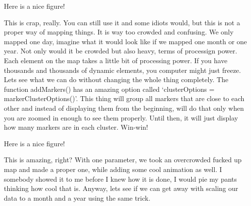 \documentclass[]{book}
\newenvironment{Shaded}{\begin{snugshade}}{\end{snugshade}}
\newcommand{\CommentTok}[1]{\textcolor[rgb]{0.56,0.35,0.01}{\textit{#1}}}
\newcommand{\DataTypeTok}[1]{\textcolor[rgb]{0.13,0.29,0.53}{#1}}
\newcommand{\DecValTok}[1]{\textcolor[rgb]{0.00,0.00,0.81}{#1}}
\newcommand{\FloatTok}[1]{\textcolor[rgb]{0.00,0.00,0.81}{#1}}
\newcommand{\KeywordTok}[1]{\textcolor[rgb]{0.13,0.29,0.53}{\textbf{#1}}}
\newcommand{\NormalTok}[1]{#1}
\newcommand{\OperatorTok}[1]{\textcolor[rgb]{0.81,0.36,0.00}{\textbf{#1}}}
\newcommand{\StringTok}[1]{\textcolor[rgb]{0.31,0.60,0.02}{#1}}
\begin{document}
\hypertarget{htmlwidget-92dc0142126f5aedeb65}{}

\label{fig:nice-fig80}Here is a nice figure!

This is crap, really. You can still use it and some idiots would, but this is not a proper way of mapping things. It is way too crowded and confusing. We only mapped one day, imagine what it would look like if we mapped one month or one year. Not only would it be crowded but also heavy, terms of processign power. Each element on the map takes a little bit of processing power. If you have thousands and thousands of dynamic elements, you computer might just freeze. Lets see what we can do without changing the whole thing completely. The function addMarkers() has an amazing option called `clusterOptions = markerClusterOptions()'. This thing will group all markers that are close to each other and instead of displaying them from the beginning, will do that only when you are zoomed in enough to see them properly. Until then, it will just display how many markers are in each cluster. Win-win!

\begin{Shaded}
\end{Shaded}

\hypertarget{htmlwidget-81e44d5a65ccabc4f47a}{}

\label{fig:nice-fig81}Here is a nice figure!

This is amazing, right? With one parameter, we took an overcrowded fucked up map and made a proper one, while adding some cool animation as well. I somebody showed it to me before I knew how it is done, I would pie my pants thinking how cool that is. Anyway, lets see if we can get away with scaling our data to a month and a year using the same trick.
\end{document}
